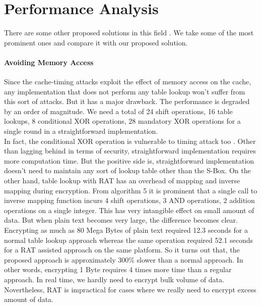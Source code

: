\section{Performance Analysis}

There are some other proposed solutions in this field \citep{osvik,paladi,rudra2001efficient,matsui2006far,matsui2007power,konighofer2008fast,meushaw2005device}. We take some of the most prominent ones and compare it with our proposed solution.\\

\paragraph{Avoiding Memory Access}
Since the cache-timing attacks exploit the effect of memory access on the cache, any implementation that does not perform any table lookup won't suffer from this sort of attacks. But it has a major drawback. The performance is degraded by an order of magnitude. We need a total of 24 shift operations, 16 table lookups, 8 conditional XOR operations, 28 mandatory XOR operations for a single round in a straightforward implementation.\\

In fact, the conditional XOR operation is vulnerable to timing attack too \citep{stallings5}. Other than lagging behind in terms of security, straightforward implementation requires more computation time. But the positive side is, straightforward implementation doesn't need to maintain any sort of lookup table other than the S-Box. On the other hand, table lookup with RAT has an overhead of mapping and inverse mapping during encryption. From algorithm 5 it is prominent that a single call to inverse mapping function incurs 4 shift operations, 3 AND operations, 2 addition operations on a single integer. This has very intangible effect on small amount of data. But when plain text becomes very large, the difference becomes clear.\\

Encrypting as much as 80 Mega Bytes of plain text required 12.3 seconds for a normal table lookup approach whereas the same operation required 52.1 seconds for a RAT assisted approach on the same platform. So it turns out that, the proposed approach is approximately 300\% slower than a normal approach. In other words, encrypting 1 Byte requires 4 times more time than a regular approach. In real time, we hardly need to encrypt bulk volume of data. Novertheless, RAT is impractical for cases where we really need to encrypt excess amount of data.\\

